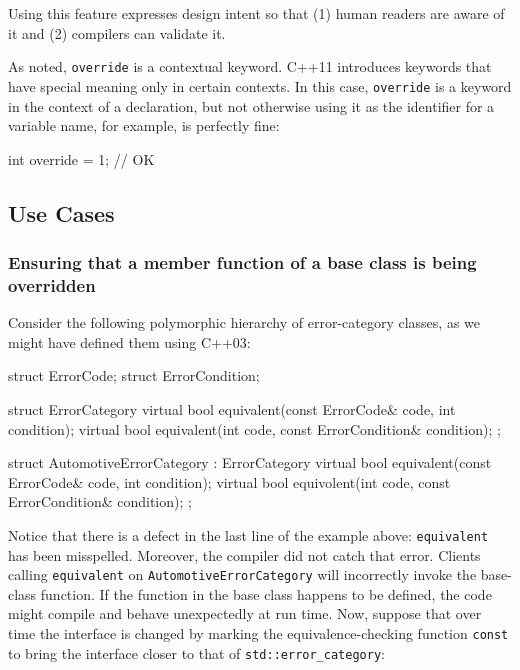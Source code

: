\noindent Using this feature expresses design intent so that (1) human readers
are aware of it and (2) compilers can validate it.

As noted, \lstinline!override! is a contextual keyword. C++11 introduces keywords that have special meaning only in certain contexts.   In this case, \lstinline!override! is a keyword in the context of a declaration, but not otherwise using it as the identifier for a variable name, for example, is perfectly fine:

\begin{emcppslisting}
int override = 1;  // OK
\end{emcppslisting}

\subsection[Use Cases]{Use Cases}\label{use-cases}

\subsubsection[Ensuring that a member function of a base class is being overridden]{Ensuring that a member function of a base class is being overridden}\label{ensuring-that-a-member-function-of-a-base-class-is-being-overridden}

Consider the following polymorphic hierarchy of error-category classes, as we might have defined them using C++03:

\begin{emcppshiddenlisting}[emcppsbatch=e1]
struct ErrorCode;
struct ErrorCondition;
\end{emcppshiddenlisting}
\begin{emcppslisting}[emcppsbatch=e1]
struct ErrorCategory
{
    virtual bool equivalent(const ErrorCode& code, int condition);
    virtual bool equivalent(int code, const ErrorCondition& condition);
};

struct AutomotiveErrorCategory : ErrorCategory
{
    virtual bool equivalent(const ErrorCode& code, int condition);
    virtual bool equivolent(int code, const ErrorCondition& condition);
};
\end{emcppslisting}

\noindent Notice that there is a defect in the last line of the example above:
\lstinline!equivalent! has been misspelled. Moreover, the compiler did not
catch that error. Clients calling \lstinline!equivalent! on
\lstinline!AutomotiveErrorCategory! will incorrectly invoke the base-class
function. If the function in the base class happens to be defined, the
code might compile and behave unexpectedly at run time. Now, suppose
that over time the interface is changed by marking the
equivalence-checking function \lstinline!const! to bring the interface
closer to that of \lstinline!std::error_category!:


